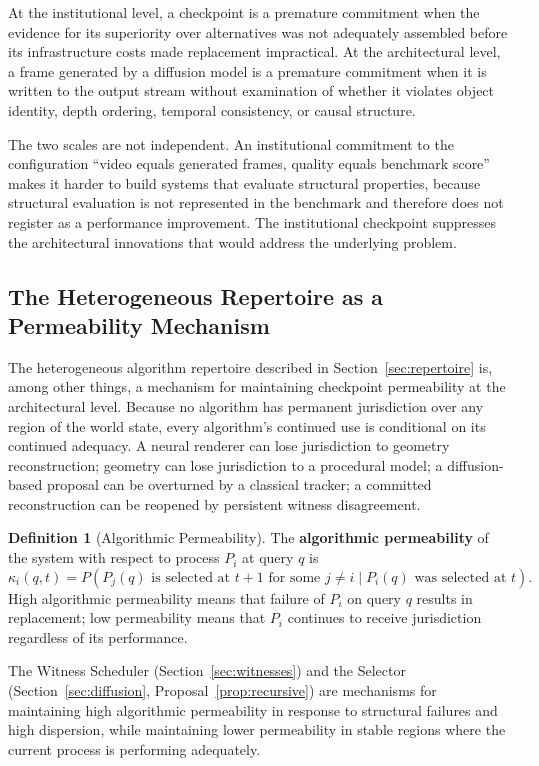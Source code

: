 \documentclass[12pt,a4paper]{article}
\theoremstyle{plain}
\theoremstyle{definition}
\newtheorem{definition}[theorem]{Definition}
\theoremstyle{remark}
\begin{document}
At the institutional level, a checkpoint is a premature commitment when the evidence for its superiority over alternatives was not adequately assembled before its infrastructure costs made replacement impractical. At the architectural level, a frame generated by a diffusion model is a premature commitment when it is written to the output stream without examination of whether it violates object identity, depth ordering, temporal consistency, or causal structure.

The two scales are not independent. An institutional commitment to the configuration ``video equals generated frames, quality equals benchmark score'' makes it harder to build systems that evaluate structural properties, because structural evaluation is not represented in the benchmark and therefore does not register as a performance improvement. The institutional checkpoint suppresses the architectural innovations that would address the underlying problem.

\subsection{The Heterogeneous Repertoire as a Permeability Mechanism}

The heterogeneous algorithm repertoire described in Section~\ref{sec:repertoire} is, among other things, a mechanism for maintaining checkpoint permeability at the architectural level. Because no algorithm has permanent jurisdiction over any region of the world state, every algorithm's continued use is conditional on its continued adequacy. A neural renderer can lose jurisdiction to geometry reconstruction; geometry can lose jurisdiction to a procedural model; a diffusion-based proposal can be overturned by a classical tracker; a committed reconstruction can be reopened by persistent witness disagreement.

\begin{definition}[Algorithmic Permeability]
The \textbf{algorithmic permeability} of the system with respect to process $P_i$ at query $q$ is
\[
\kappa_i(q, t) = P(P_j(q) \text{ is selected at } t+1 \text{ for some } j \neq i \mid P_i(q) \text{ was selected at } t).
\]
High algorithmic permeability means that failure of $P_i$ on query $q$ results in replacement; low permeability means that $P_i$ continues to receive jurisdiction regardless of its performance.
\end{definition}

The Witness Scheduler (Section~\ref{sec:witnesses}) and the Selector (Section~\ref{sec:diffusion}, Proposal~\ref{prop:recursive}) are mechanisms for maintaining high algorithmic permeability in response to structural failures and high dispersion, while maintaining lower permeability in stable regions where the current process is performing adequately.
\end{document}
